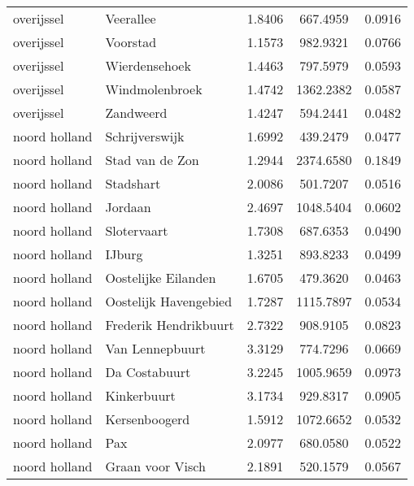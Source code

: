 \begin{longtable}{llccc}
	overijssel    & Veerallee                        & 1.8406  & 667.4959  & 0.0916          \\
	overijssel    & Voorstad                         & 1.1573  & 982.9321  & 0.0766          \\
	overijssel    & Wierdensehoek                    & 1.4463  & 797.5979  & 0.0593          \\
	overijssel    & Windmolenbroek                   & 1.4742  & 1362.2382 & 0.0587          \\
	overijssel    & Zandweerd                        & 1.4247  & 594.2441  & 0.0482          \\
	noord holland & Schrijverswijk                   & 1.6992  & 439.2479  & 0.0477          \\
	noord holland & Stad van de Zon                  & 1.2944  & 2374.6580 & 0.1849          \\
	noord holland & Stadshart                        & 2.0086  & 501.7207  & 0.0516          \\
	noord holland & Jordaan                          & 2.4697  & 1048.5404 & 0.0602          \\
	noord holland & Slotervaart                      & 1.7308  & 687.6353  & 0.0490          \\
	noord holland & IJburg                           & 1.3251  & 893.8233  & 0.0499          \\
	noord holland & Oostelijke Eilanden              & 1.6705  & 479.3620  & 0.0463          \\
	noord holland & Oostelijk Havengebied            & 1.7287  & 1115.7897 & 0.0534          \\
	noord holland & Frederik Hendrikbuurt            & 2.7322  & 908.9105  & 0.0823          \\
	noord holland & Van Lennepbuurt                  & 3.3129  & 774.7296  & 0.0669          \\
	noord holland & Da Costabuurt                    & 3.2245  & 1005.9659 & 0.0973          \\
	noord holland & Kinkerbuurt                      & 3.1734  & 929.8317  & 0.0905          \\
	noord holland & Kersenboogerd                    & 1.5912  & 1072.6652 & 0.0532          \\
	noord holland & Pax                              & 2.0977  & 680.0580  & 0.0522          \\
	noord holland & Graan voor Visch                 & 2.1891  & 520.1579  & 0.0567          \\

\end{longtable}

